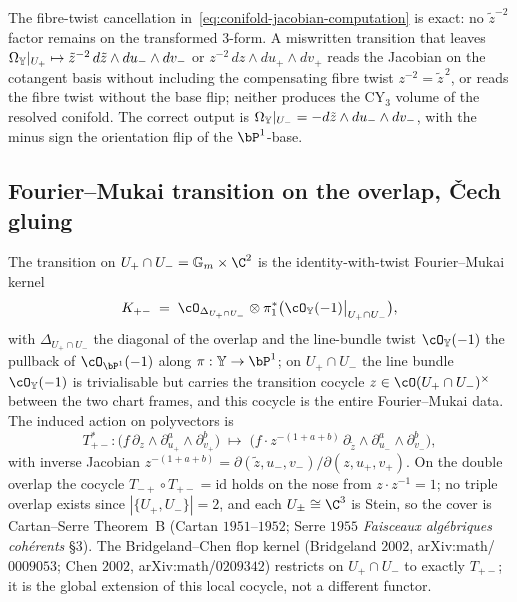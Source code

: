 \begin{remark}
\label{rem:conifold-jacobian-no-residual}
The fibre-twist cancellation in~\eqref{eq:conifold-jacobian-computation} is exact: no $\tilde z^{-2}$ factor remains on the transformed $3$-form. A miswritten transition that leaves $\Omega_{\mathbb{Y}}|_{U_+} \mapsto \tilde z^{-2}\,d\tilde z \wedge du_- \wedge dv_-$ or $z^{-2}\,dz \wedge du_+ \wedge dv_+$ reads the Jacobian on the cotangent basis without including the compensating fibre twist $z^{-2} = \tilde z^{\,2}$, or reads the fibre twist without the base flip; neither produces the CY$_3$ volume of the resolved conifold. The correct output is $\Omega_{\mathbb{Y}}|_{U_-} = -d\tilde z \wedge du_- \wedge dv_-$, with the minus sign the orientation flip of the $\bP^1$-base.
\end{remark}

\subsection{Fourier--Mukai transition on the overlap, \v{C}ech gluing}

The transition on $U_+ \cap U_- = \Gm \times \C^2$ is the identity-with-twist Fourier--Mukai kernel
\[
 K_{+-} \;=\; \cO_{\Delta_{U_+ \cap U_-}} \otimes \pi_1^*\bigl(\cO_\bY(-1)\big|_{U_+ \cap U_-}\bigr),
\]
with $\Delta_{U_+ \cap U_-}$ the diagonal of the overlap and the line-bundle twist $\cO_\bY(-1)$ the pullback of $\cO_{\bP^1}(-1)$ along $\pi : \bY \to \bP^1$; on $U_+ \cap U_-$ the line bundle $\cO_\bY(-1)$ is trivialisable but carries the transition cocycle $z \in \cO(U_+ \cap U_-)^\times$ between the two chart frames, and this cocycle is the entire Fourier--Mukai data. The induced action on polyvectors is
\[
 T_{+-}^* : \bigl(f\, \partial_z \wedge \partial_{u_+}^a \wedge \partial_{v_+}^b\bigr) \;\mapsto\; \bigl(f \cdot z^{-(1+a+b)}\, \partial_{\tilde z} \wedge \partial_{u_-}^a \wedge \partial_{v_-}^b\bigr),
\]
with inverse Jacobian $z^{-(1+a+b)} = \partial(\tilde z, u_-, v_-)/\partial(z, u_+, v_+)$. On the double overlap the cocycle $T_{-+} \circ T_{+-} = \mathrm{id}$ holds on the nose from $z \cdot z^{-1} = 1$; no triple overlap exists since $|\{U_+, U_-\}| = 2$, and each $U_\pm \cong \C^3$ is Stein, so the cover is Cartan--Serre Theorem~B (Cartan $1951$--$1952$; Serre $1955$ \emph{Faisceaux alg\'ebriques coh\'erents} \S$3$). The Bridgeland--Chen flop kernel (Bridgeland $2002$, arXiv:math/$0009053$; Chen $2002$, arXiv:math/$0209342$) restricts on $U_+ \cap U_-$ to exactly $T_{+-}$; it is the global extension of this local cocycle, not a different functor.


